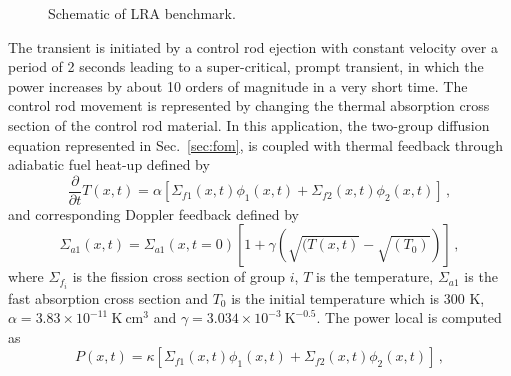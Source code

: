 \documentclass[]{interact}
\theoremstyle{plain}%
\theoremstyle{definition}
\theoremstyle{remark}
\begin{document}
\begin{figure}[h!]
	\caption{Schematic of LRA benchmark.}
	\label{fig:lra core}
\end{figure}
The transient is initiated by a control rod ejection with constant velocity over a period of 2 seconds leading to a super-critical, prompt transient, in which the power increases by about 10 orders of magnitude in a very short time.
The control rod movement is represented by changing the thermal absorption cross section of the control rod material.
In this application, the two-group diffusion equation represented in Sec.~\ref{sec:fom}, is coupled with thermal feedback through adiabatic fuel heat-up defined by
\begin{equation}
	\frac{\partial}{\partial t}T(x,t) = \alpha[\Sigma_{f1}(x,t)\phi_1(x,t)+\Sigma_{f2}(x,t)\phi_2(x,t)] \, ,
	\label{eq:heatup}
\end{equation}
and corresponding Doppler feedback defined by
\begin{equation}
	\Sigma_{a1}(x,t) = \Sigma_{a1}(x,t=0)[1+\gamma(\sqrt{(T(x,t)}-\sqrt{(T_0)})] \, ,
	\label{eq:doppler}
\end{equation}
where $\Sigma_{f_i}$ is the fission cross section of group $i$, $T$ is the temperature, $\Sigma_{a1}$ is the fast absorption cross section and $T_0$ is the initial temperature which is $300 $ K,
$\alpha = 3.83\times 10^{-11}~\text{K}~\text{cm}^3$ and $\gamma = 3.034\times 10^{-3} ~\text{K}^{-0.5}$.
The power local is computed as
\begin{equation}
	P(x,t)=\kappa [\Sigma_{f1}(x,t)\phi_1(x,t)+\Sigma_{f2}(x,t)\phi_2(x,t)] \, ,
\end{equation}
\end{document}
